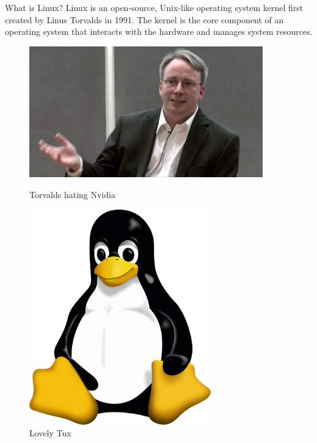 \documentclass{beamer}
\begin{document}
\begin{frame}{What is Linux?}
	Linux is an open-source, Unix-like operating system kernel first created by Linus Torvalds 
	in 1991. The kernel is the core component of an operating system that interacts with the 
	hardware and manages system resources.
	\begin{figure}
		\begin{minipage}{0.45\textwidth}
			\centering
			\includegraphics[width=0.9\textwidth]{images/torvalds.jpg}
			\caption{Torvalds hating Nvidia}
		\end{minipage}\hfill
		\begin{minipage}{0.45\textwidth}
			\centering
			\includegraphics[width=0.7\textwidth]{images/tux.png}
			\caption{Lovely Tux}
		\end{minipage}
	\end{figure}
\end{frame}
\end{document}
